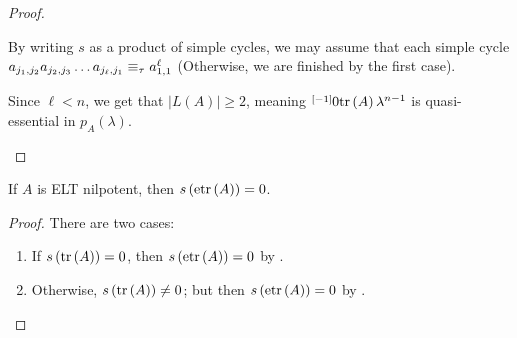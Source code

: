 \begin{proof}
\begin{casenv}
    By writing $s$ as a product of simple cycles, we may assume that each simple cycle $a_{j_{1},j_{2}}a_{j_{2},j_{3}}\dots a_{j_{\ell},j_{1}}\equiv_{\tau}a_{1,1}^{\ell}$ (Otherwise, we are finished by the first case).

    Since $\ell<n$, we get that $\left|L\left(A\right)\right|\ge2$, meaning $\overset{\left[-1\right]}{}0\textnormal{tr}\left(A\right)\lambda^{n-1}$ is quasi-essential in $p_{A}\left(\lambda\right)$.
\end{casenv}
\end{proof}

\begin{cor}\label{cor:etr-of-nilpotent}
If $A$ is ELT nilpotent, then $s\left(\textnormal{etr}\left(A\right)\right)=0$.
\end{cor}
\begin{proof}
There are two cases:
\begin{enumerate}
\item If $s\left(\textnormal{tr}\left(A\right)\right)=0$, then $s\left(\textnormal{etr}\left(A\right)\right)=0$ by .
\item Otherwise, $s\left(\textnormal{tr}\left(A\right)\right)\neq 0$; but then $s\left(\textnormal{etr}\left(A\right)\right)=0$ by .
\end{enumerate}
\end{proof}
